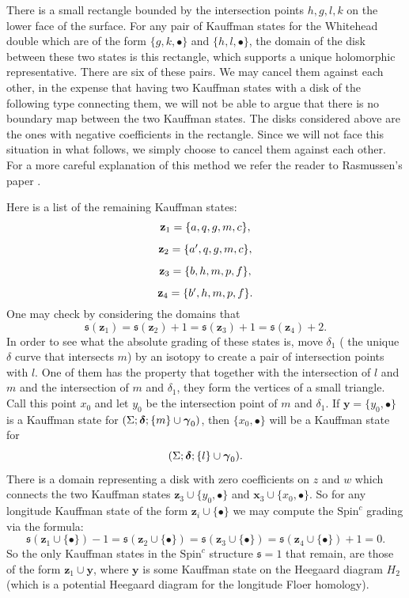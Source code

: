\documentclass{gtart_h}
\theoremstyle{definition}
\newcommand\x{\mathbf x}
\newcommand\z{\mathbf z}
\newcommand\y{\mathbf y}
\newcommand{\spinc}{\mathfrak s}
\newcommand\gammas{\mbox{\boldmath$\gamma$}}
\newcommand\deltas{\mbox{\boldmath$\delta$}}
\newcommand{\SpinC}{{\mathrm{Spin}}^c}
\begin{document}
There is a small rectangle bounded by the
intersection points $h,g,l,k$ on the lower face of the surface.
For any pair of Kauffman states for the Whitehead double
which are of the form $\{g,k,\bullet\}$ and $\{h,l,\bullet\}$, the domain of the
disk between these two states
is this rectangle, which supports a unique holomorphic representative. There are six of
these pairs. We may cancel them against each other, in the expense that having two Kauffman states
with a disk of the following type connecting them,
we will not be able to argue that there is no
boundary map between the two Kauffman states.
The disks considered above are the ones with negative coefficients in the rectangle.
Since we will not face this situation in
what follows, we simply choose to cancel them against each other. For a more careful
explanation of this method we refer the reader to Rasmussen's paper \cite{Ras}.

Here is a list of the remaining  Kauffman states:
\begin{displaymath}
\begin{CD}
\z_1=\{a,q,g,m,c\},\\
\z_2=\{a',q,g,m,c\},\\
\z_3=\{b,h,m,p,f\},\\
\z_4=\{b',h,m,p,f\}.
\end{CD}
\end{displaymath}
One may check by considering the domains that
\begin{equation}
\spinc(\z_1)=\spinc(\z_2)+1=\spinc(\z_3)+1=\spinc(\z_4)+2.
\end{equation}
In order to see what the absolute grading of these states is, move $\delta_1$ (
the unique $\delta$ curve that intersects $m$) by an isotopy
 to create a pair of intersection points
with $l$. One of them has the property that together with the intersection of $l$ and $m$
and the intersection of $m$ and $\delta_1$, they form the vertices of a small triangle.
Call this point $x_0$ and let $y_0$ be the intersection point of $m$ and $\delta_1$.
If $\y=\{y_0,\bullet\}$ is a Kauffman state for
$(\Sigma;\deltas;\{m\}\cup \gammas_0)$, then $\{x_0,\bullet\}$ will be a
Kauffman state for
$$
(\Sigma;\deltas;\{l\}\cup \gammas_0).$$
There is a domain representing a disk with zero coefficients on $z$ and $w$ which
connects the two Kauffman states $\z_3\cup \{y_0,\bullet\}$ and
$\x_3\cup \{x_0,\bullet\}$. So for any longitude Kauffman state
of the form $\z_i\cup \{\bullet\}$ we may compute the $\SpinC$
grading via the formula:
\begin{equation}
\spinc(\z_1\cup \{\bullet\})-1=\spinc(\z_2\cup \{\bullet\})=
\spinc(\z_3\cup \{\bullet\})=\spinc(\z_4\cup \{\bullet\})+1=0.
\end{equation}
So the only Kauffman states in the $\SpinC$ structure $\spinc=1$ that remain, are those of the form
$\z_1\cup \y$, where $\y$ is some Kauffman state on the
Heegaard diagram $H_2$ (which is a potential Heegaard diagram for the longitude
Floer homology).
\end{document}
